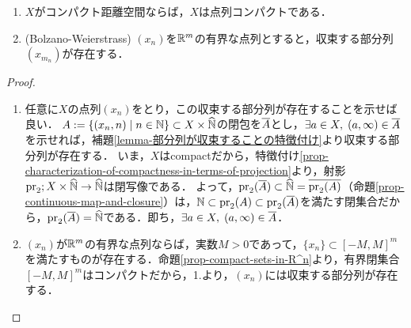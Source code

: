\documentclass[uplatex,dvipdfmx]{jsreport}
\begin{document}
\begin{proposition}[コンパクト距離空間は点列コンパクトである]\mbox{}\label{prop-Bolzano-Weierstrass}
    \begin{enumerate}
        \item $X$がコンパクト距離空間ならば，$X$は点列コンパクトである．
        \item (Bolzano-Weierstrass) $(x_n)$を$\mathbb{R}^m$の有界な点列とすると，収束する部分列$(x_{m_n})$が存在する．
    \end{enumerate}
\end{proposition}
\begin{proof}\mbox{}
    \begin{enumerate}
        \item 任意に$X$の点列$(x_n)$をとり，この収束する部分列が存在することを示せば良い．
        $A:=\{(x_n,n)\mid n\in\mathbb{N}\}\subset X\times\widehat{\mathbb{N}}$の閉包を$\overline{A}$とし，$\exists a\in X,\;(a,\infty)\in\overline{A}$を示せれば，補題\ref{lemma-部分列が収束することの特徴付け}より収束する部分列が存在する．
        いま，$X$はcompactだから，特徴付け\ref{prop-characterization-of-compactness-in-terms-of-projection}より，射影$\mathrm{pr}_2;X\times\widehat{\mathbb{N}}\to\widehat{\mathbb{N}}$は閉写像である．
        よって，$\mathrm{pr}_2(\overline{A})\subset\widehat{\mathbb{N}}=\overline{\mathrm{pr}_2(A)}$（命題\ref{prop-continuous-map-and-closure}）は，$\mathbb{N}\subset\mathrm{pr}_2(A)\subset\mathrm{pr}_2(\overline{A})$を満たす閉集合だから，$\mathrm{pr}_2(\overline{A})=\widehat{\mathbb{N}}$である．即ち，$\exists a\in X,\;(a,\infty)\in\overline{A}$．
        \item 
        $(x_n)$が$\mathbb{R}^m$の有界な点列ならば，実数$M>0$であって，$\{x_n\}\subset[-M,M]^m$を満たすものが存在する．命題\ref{prop-compact-sets-in-R^n}より，有界閉集合$[-M,M]^m$はコンパクトだから，1.より，$(x_n)$には収束する部分列が存在する．
    \end{enumerate}
\end{proof}
\end{document}
